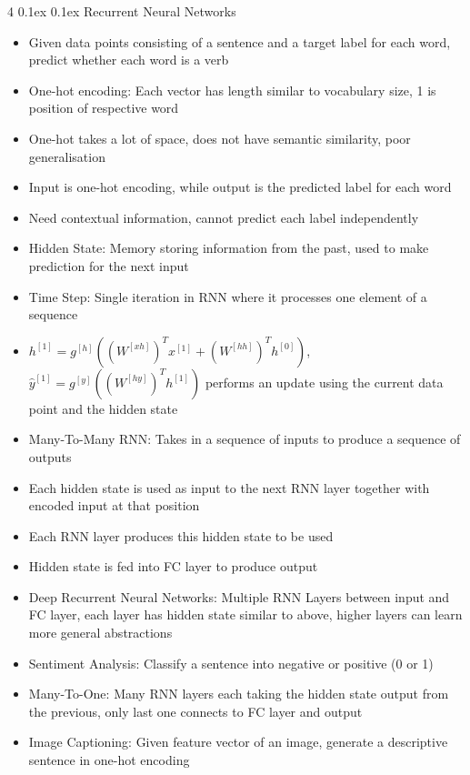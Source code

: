 \documentclass[10pt, landscape]{article}
\makeatletter
\renewcommand{\section}{\@startsection{section}{1}{0mm}%
  {0.1ex} %
  {0.1ex} %
  {\normalfont\large\bfseries}}
\makeatother
\begin{document}
\begin{multicols*}{4}
\section{Recurrent Neural Networks}
\begin{itemize}
    \item Given data points consisting of a sentence and a target label for each word, predict whether each word is a verb
    \item One-hot encoding: Each vector has length similar to vocabulary size, 1 is position of respective word
    \item One-hot takes a lot of space, does not have semantic similarity, poor generalisation
    \item Input is one-hot encoding, while output is the predicted label for each word
    \item Need contextual information, cannot predict each label independently
    \item Hidden State: Memory storing information from the past, used to make prediction for the next input
    \item Time Step: Single iteration in RNN where it processes one element of a sequence
    \item $h^{[1]}=g^{[h]}((W^{[xh]})^Tx^{[1]}+(W^{[hh]})^Th^{[0]})$, $\hat{y}^{[1]}=g^{[y]}((W^{[hy]})^Th^{[1]})$ performs an update using the current data point and the hidden state
    \item Many-To-Many RNN: Takes in a sequence of inputs to produce a sequence of outputs
    \item Each hidden state is used as input to the next RNN layer together with encoded input at that position
    \item Each RNN layer produces this hidden state to be used
    \item Hidden state is fed into FC layer to produce output
    \item Deep Recurrent Neural Networks: Multiple RNN Layers between input and FC layer, each layer has hidden state similar to above, higher layers can learn more general abstractions
    \item Sentiment Analysis: Classify a sentence into negative or positive (0 or 1)
    \item Many-To-One: Many RNN layers each taking the hidden state output from the previous, only last one connects to FC layer and output
    \item Image Captioning: Given feature vector of an image, generate a descriptive sentence in one-hot encoding

\end{itemize}
\end{multicols*}
\end{document}
